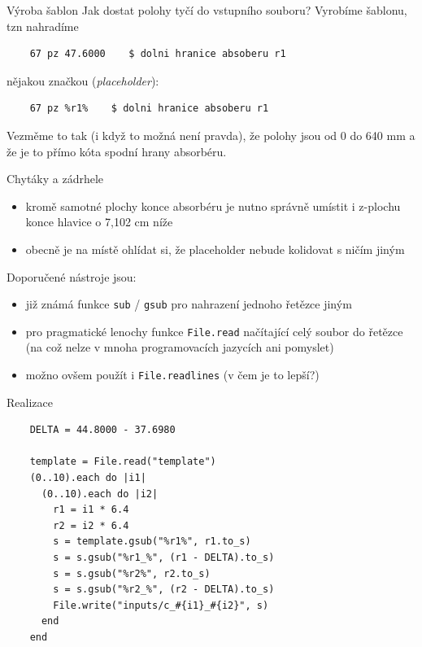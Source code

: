 \documentclass{beamer}
\begin{document}
\begin{frame}[fragile]{Výroba šablon}
  Jak dostat polohy tyčí do vstupního souboru? Vyrobíme šablonu, tzn nahradíme
  \begin{verbatim}
    67 pz 47.6000    $ dolni hranice absoberu r1
  \end{verbatim}
  \pause
  nějakou značkou (\emph{placeholder}):
  \begin{verbatim}
    67 pz %r1%    $ dolni hranice absoberu r1
  \end{verbatim}
  Vezměme to tak (i když to možná není pravda), že polohy jsou od 0 do 640 mm a že je to přímo kóta spodní hrany absorbéru.
\end{frame}

\begin{frame}{Chytáky a zádrhele}
  \begin{itemize}
    \item kromě samotné plochy konce absorbéru je nutno správně umístit i z-plochu konce hlavice o 7,102 cm níže
    \item obecně je na místě ohlídat si, že placeholder nebude kolidovat s ničím jiným
  \end{itemize}
  Doporučené nástroje jsou:
  \begin{itemize}
    \item již známá funkce \texttt{sub} / \texttt{gsub} pro nahrazení jednoho řetězce jiným
    \item pro pragmatické lenochy funkce \texttt{File.read} načítající celý soubor do řetězce (na což nelze v mnoha programovacích jazycích ani pomyslet)
    \item možno ovšem použít i \texttt{File.readlines} (v čem je to lepší?)
  \end{itemize}
\end{frame}

\begin{frame}[fragile]{Realizace}
  \scriptsize
  \begin{verbatim}
    DELTA = 44.8000 - 37.6980

    template = File.read("template")
    (0..10).each do |i1|
      (0..10).each do |i2|
        r1 = i1 * 6.4
        r2 = i2 * 6.4
        s = template.gsub("%r1%", r1.to_s)
        s = s.gsub("%r1_%", (r1 - DELTA).to_s)
        s = s.gsub("%r2%", r2.to_s)
        s = s.gsub("%r2_%", (r2 - DELTA).to_s)
        File.write("inputs/c_#{i1}_#{i2}", s)
      end
    end
  \end{verbatim}
\end{frame}
\end{document}
